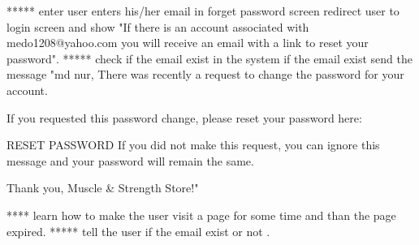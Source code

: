  ***** enter user enters his/her email in forget password screen redirect user to login screen and show 
  "If there is an account associated with medo1208@yahoo.com you will receive an email with a link to 
  reset your password".
 ***** check if the email exist in the system if the email exist send the message 
  "md nur,
  There was recently a request to change the password for your account.

  If you requested this password change, please reset your password here:

  RESET PASSWORD
  If you did not make this request, you can ignore this message and your password will remain the same.

  Thank you, Muscle & Strength Store!"

**** learn how to make the user visit a page for some time and than the page expired.
***** tell the user if the email exist or not .
